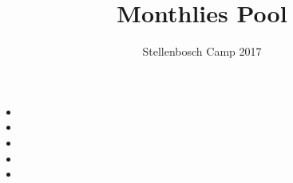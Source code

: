 \documentclass[12pt]{article}
\title{Monthlies Pool}
\author{Stellenbosch Camp 2017}
\begin{document}
 \maketitle

\begin{itemize}

\item %


\item %


\item %
 

\item %


\item %


\end{itemize}

\vfill

\centering
\begin{BVerbatim}
\end{BVerbatim}
\end{document}
